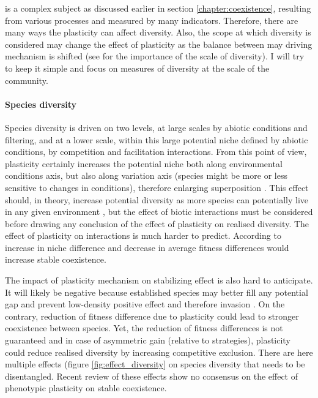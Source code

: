  is a complex subject as discussed earlier in section \ref{chapter:coexistence}, resulting from various processes and measured by many indicators. Therefore, there are many ways the plasticity can affect diversity. Also, the scope at which diversity is considered may change the effect of plasticity as the balance between may driving mechanism is shifted (see \cite{chalmandrier_communities_2015} for the importance of the scale of diversity). I will try to keep it simple and focus on measures of diversity at the scale of the community.
\paragraph{Species diversity}

Species diversity is driven on two levels, at large scales by abiotic conditions and filtering, and at a lower scale, within this large potential niche defined by abiotic conditions, by competition and facilitation interactions. From this point of view, plasticity certainly increases the potential niche both along environmental conditions axis, but also along variation axis (species might be more or less sensitive to changes in conditions), therefore enlarging  superposition \parencite{violle_return_2012}. This effect should, in theory, increase potential diversity as more species can potentially live in any given environment \parencite{lepik_high_2005, jung_intraspecific_2014}, but the effect of biotic interactions must be considered before drawing any conclusion of the effect of plasticity on realised diversity. The effect of plasticity on interactions is much harder to predict. According to \cite{adler_coexistence_2007} increase in niche difference and decrease in average fitness differences would increase stable coexistence.

The impact of plasticity mechanism on stabilizing effect is also hard to anticipate. It will likely be negative because established species may better fill any potential gap and prevent low-density positive effect and therefore invasion \parencite{berg_trait_2010}. On the contrary, reduction of fitness difference due to plasticity could lead to stronger coexistence between species. Yet, the reduction of fitness differences is not guaranteed and in case of asymmetric gain (relative to strategies), plasticity could reduce realised diversity by increasing competitive exclusion.
There are here multiple effects (figure \ref{fig:effect_diversity} on species diversity that needs to be disentangled. Recent review \parencite{turcotte_phenotypic_2016} of these effects show no consensus on the effect of phenotypic plasticity on stable coexistence.

